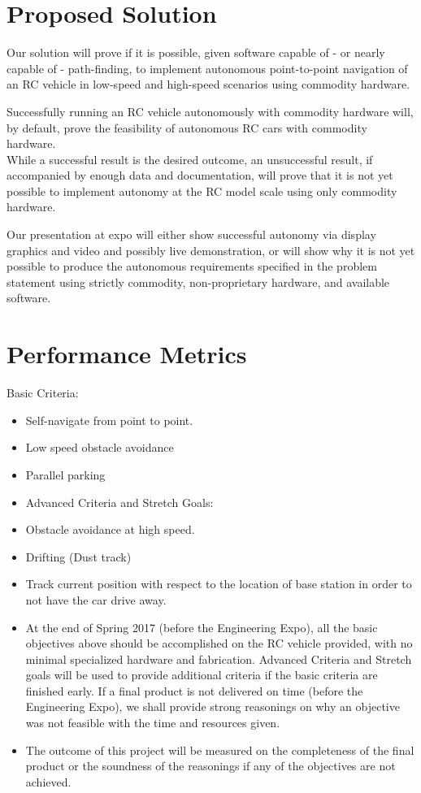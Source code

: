 \documentclass[draftclsnofoot,onecolumn,10pt]{IEEEtran}
\begin{document}
\section{Proposed Solution}
Our solution will prove if it is possible, given software capable of - or nearly
capable of - path-finding, to implement autonomous point-to-point navigation of
an RC vehicle in low-speed and high-speed scenarios using commodity hardware.

Successfully running an RC vehicle autonomously with commodity hardware will, by
default, prove the feasibility of autonomous RC cars with commodity hardware.\\
While a successful result is the desired outcome, an unsuccessful result, if 
accompanied by enough data and documentation, will prove that it is not yet 
possible to implement autonomy at the RC model scale using only commodity hardware.

Our presentation at expo will either show successful autonomy via display 
graphics and video and possibly live demonstration, or will show why it is 
not yet possible to produce the autonomous requirements specified in the 
problem statement using strictly commodity, non-proprietary hardware, 
and available software.

\section{Performance Metrics}
Basic Criteria:
\begin{itemize}
	\item Self-navigate from point to point.
	\item Low speed obstacle avoidance
	\item Parallel parking
	\item Advanced Criteria and Stretch Goals:
	\item Obstacle avoidance at high speed.
	\item Drifting (Dust track) 
	\item Track current position with respect to the location of base station in order to not have the car drive away. 
	\item At the end of Spring 2017 (before the Engineering Expo), all the basic objectives above should be accomplished on the RC vehicle provided, with no minimal specialized hardware and fabrication. Advanced Criteria and Stretch goals will be used to provide additional criteria if the basic criteria are finished early. If a final product is not delivered on time (before the Engineering Expo), we shall provide strong reasonings on why an objective was not feasible with the time and resources given. 
	\item The outcome of this project will be measured on the completeness of the final product or the soundness of the reasonings if any of the objectives are not achieved. 
\end{itemize}
\end{document}
